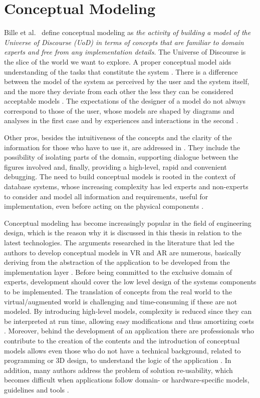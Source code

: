 \section{Conceptual Modeling}
\label{sec:background-conceptual}

Bille et al.~\cite{bille_conceptual_2007} define conceptual modeling as \textit{the activity of building a model of the Universe of Discourse (UoD) in terms of concepts that are familiar to domain experts and free from any implementation details}. The Universe of Discourse is the slice of the world we want to explore. 
A proper conceptual model aids understanding of the tasks that constitute the system \cite{norman_design_2013}. There is a difference between the model of the system as perceived by the user and the system itself, and the more they deviate from each other the less they can be considered acceptable models \cite{rosson_usability_2002}. The expectations of the designer of a model do not always correspond to those of the user, whose models are shaped by diagrams and analyses in the first case and by experiences and interactions in the second \cite{laviola_jr_3d_2017}. 

Other pros, besides the intuitiveness of the concepts and the clarity of the information for those who have to use it, are addressed in \cite{bille_conceptual_2007}. They include the possibility of isolating parts of the domain, supporting dialogue between the figures involved and, finally, providing a high-level, rapid and convenient debugging. 
The need to build conceptual models is rooted in the context of database systems, whose increasing complexity has led experts and non-experts to consider and model all information and requirements, useful for implementation, even before acting on the physical components \cite{connolly_database_2005}.

Conceptual modeling has become increasingly popular in the field of engineering design, which is the reason why it is discussed in this thesis in relation to the latest technologies. 
The arguments researched in the literature that led the authors to develop conceptual models in VR and AR are numerous, basically deriving from the abstraction of the application to be developed from the implementation layer \cite{de_troyer_conceptual_2007}. Before being committed to the exclusive domain of experts, development should cover the low level design of the systems components to be implemented. The translation of concepts from the real world to the virtual/augmented world is challenging and time-consuming if these are not modeled. By introducing high-level models, complexity is reduced since they can be interpreted at run time, allowing easy modifications and thus amortizing costs \cite{coninx_vr-demo_2006}. 
Moreover, behind the development of an application there are professionals who contribute to the creation of the contents and the introduction of conceptual models allows even those who do not have a technical background, related to programming or 3D design, to understand the logic of the application \cite{walczak_structured_2008}. 
In addition, many authors address the problem of solution re-usability, which becomes difficult when applications follow domain- or hardware-specific models, guidelines and tools \cite{figueroa_conceptual_2006}. 

